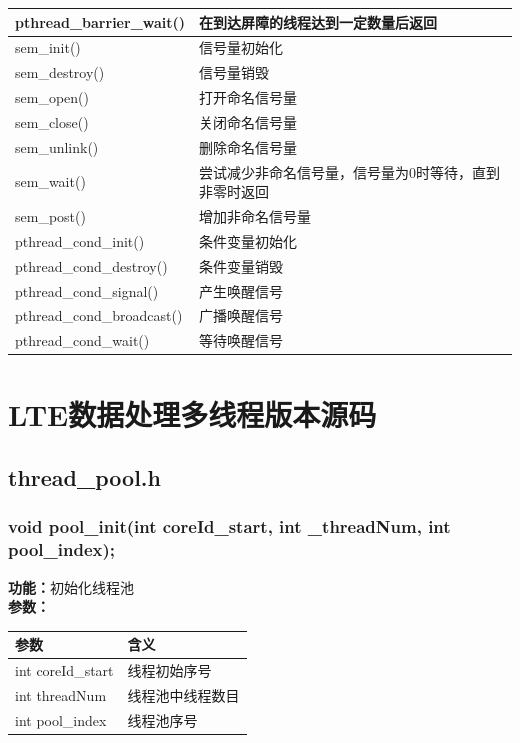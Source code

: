 \documentclass{article}
\begin{document}
\begin{tabular}[H]{|l|l|}
	\hline
	pthread\_barrier\_wait()    & 在到达屏障的线程达到一定数量后返回                    \\
	\hline
	sem\_init()                 & 信号量初始化                                          \\
	\hline
	sem\_destroy()              & 信号量销毁                                            \\
	\hline
	sem\_open()                 & 打开命名信号量                                        \\
	\hline
	sem\_close()                & 关闭命名信号量                                        \\
	\hline
	sem\_unlink()               & 删除命名信号量                                        \\
	\hline
	sem\_wait()                 & 尝试减少非命名信号量，信号量为0时等待，直到非零时返回 \\
	\hline
	sem\_post()                 & 增加非命名信号量                                      \\
	\hline
	pthread\_cond\_init()       & 条件变量初始化                                        \\
	\hline
	pthread\_cond\_destroy()    & 条件变量销毁                                          \\
	\hline
	pthread\_cond\_signal()     & 产生唤醒信号                                          \\
	\hline
	pthread\_cond\_broadcast()  & 广播唤醒信号                                          \\
	\hline
	pthread\_cond\_wait()       & 等待唤醒信号                                          \\
	\hline  %
\end{tabular}

\section{LTE数据处理多线程版本源码}
\subsection{thread\_pool.h}
\subsubsection{void pool\_init(int coreId\_start, int \_threadNum, int pool\_index);}
\textbf{功能：}初始化线程池\\
\textbf{参数：}\\
\begin{tabular}[H]{|l|l|}%
	\hline  %
	参数              & 含义             \\
	\hline
	int coreId\_start & 线程初始序号     \\
	\hline
	int threadNum     & 线程池中线程数目 \\
	\hline
	int pool\_index   & 线程池序号       \\
	\hline
\end{tabular}
\end{document}
